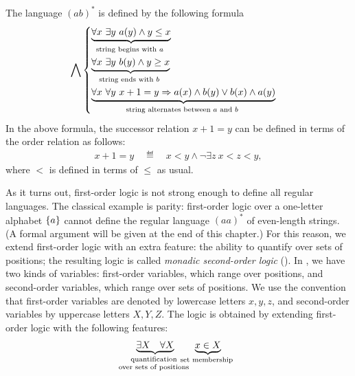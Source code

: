 \begin{myexample}\label{ex:logic-ab-star}
    The language $(ab)^*$ is defined by the following formula 
\begin{align*}
\bigwedge
\begin{cases}
    \myunderbrace{\forall x \ \exists y \ a(y) \land y \leq x}{string begins with $a$} \\ 
    \myunderbrace{\forall x \ \exists y \ b(y) \land y \geq x}{string ends with $b$} \\
    \myunderbrace{\forall x \ \forall y \ x + 1 = y \Rightarrow a(x) \land b(y) \lor b(x) \land a(y)}{string alternates between $a$ and $b$}
\end{cases}
\end{align*}
In the above formula, the successor relation $x+1 = y$ can be defined in terms of the order relation as follows:
\begin{align*}x + 1 = y \quad \eqdef \quad x < y \land \neg \exists z \ x < z < y,\end{align*}
where $<$ is defined in terms of $\leq$ as usual.
\end{myexample}

As it turns out, first-order logic is not strong enough to define all regular languages. The classical example is parity: first-order logic over a one-letter alphabet $\{a\}$ cannot define  the regular language $(aa)^*$ of even-length strings. (A formal argument will be given at the end of this chapter.)  For this reason, we extend first-order logic with an extra feature: the ability to quantify over sets of positions; the resulting logic is called \emph{monadic second-order logic} (\mso). In \mso, we have two  kinds of variables: first-order variables, which range over positions, and second-order variables, which range over sets of positions.  We use the convention that first-order variables are denoted by lowercase letters $x, y, z$, and second-order variables by uppercase letters $X, Y, Z$. The logic \mso is obtained by extending first-order logic with the following features:
\begin{align*}
\myunderbrace{\exists X \quad \forall X}{quantification \\ over sets of positions}
\qquad 
\myunderbrace{x \in X }{set membership}
\end{align*}


